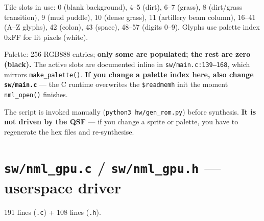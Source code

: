 \documentclass[11pt,letterpaper]{article}
\begin{document}
Tile slots in use: 0 (blank background), 4--5 (dirt), 6--7 (grass), 8
(dirt/grass transition), 9 (mud puddle), 10 (dense grass), 11 (artillery
beam column), 16--41 (A--Z glyphs), 42 (colon), 43 (space), 48--57
(digits 0--9). Glyphs use palette index 0xFF for lit pixels (white).

Palette: 256 RGB888 entries; \textbf{only some are populated; the rest are
zero (black).} The active slots are documented inline in
\texttt{sw/main.c:139--168}, which mirrors \texttt{make\_palette()}.
\textbf{If you change a palette index here, also change \texttt{sw/main.c}}
--- the C runtime overwrites the \texttt{\$readmemh} init the moment
\texttt{nml\_open()} finishes.

The script is invoked manually (\texttt{python3 hw/gen\_rom.py}) before
synthesis. \textbf{It is not driven by the QSF} --- if you change a sprite
or palette, you have to regenerate the hex files and re-synthesise.

\section{\texttt{sw/nml\_gpu.c} / \texttt{sw/nml\_gpu.h} --- userspace driver}

191 lines (\texttt{.c}) + 108 lines (\texttt{.h}).
\end{document}
